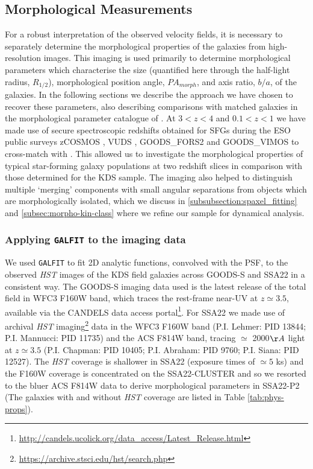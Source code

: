 \documentclass[fleqn,usenatbib]{mnras}
\begin{document}
\subsection{Morphological Measurements}\label{subsec:morphological_measurements}
For a robust interpretation of the observed velocity fields, it is necessary to separately determine the morphological properties of the galaxies from high-resolution images.
This imaging is used primarily to determine morphological parameters which characterise the size (quantified here through the half-light radius, $R_{1/2}$), morphological position angle, $PA_{morph}$, and axis ratio, $b/a$, of the galaxies. 
In the following sections we describe the approach we have chosen to recover these parameters, also describing comparisons with matched galaxies in the morphological parameter catalogue of \cite{VanderWel2012}.
At $3 < z < 4$ and $0.1 < z < 1$ we have made use of secure spectroscopic redshifts obtained for SFGs during the ESO public surveys zCOSMOS \citep{Lilly2007}, VUDS \citep{Tasca2016}, GOODS\_FORS2 \citep{Vanzella2005,Vanzella2006,Vanzella2008} and GOODS\_VIMOS \citep{Balestra2010} to cross-match with \cite{VanderWel2012}.
This allowed us to investigate the morphological properties of typical star-forming galaxy populations at two redshift slices in comparison with those determined for the KDS sample.
The imaging also helped to distinguish multiple `merging' components with small angular separations from objects which are morphologically isolated, which we discuss in \cref{subsubsection:spaxel_fitting} and \cref{subsec:morpho-kin-class} where we refine our sample for dynamical analysis.

\subsubsection{Applying {\tt GALFIT} to the imaging data}\label{subsubsec:galfitting}
We used {\tt GALFIT} \citep{Peng2010_galfit} to fit 2D analytic functions, convolved with the PSF, to the observed {\em HST} images of the KDS field galaxies across GOODS-S and SSA22 in a consistent way.
The GOODS-S imaging data used is the latest release of the total field in WFC3 F160W band, which traces the rest-frame near-UV at $z\simeq3.5$, available via the CANDELS \citep{Grogin2011,Koekemoer2011} data access portal\footnote{\url{http://candels.ucolick.org/data_access/Latest_Release.html}}.
For SSA22 we made use of archival {\em HST} imaging\footnote{\url{https://archive.stsci.edu/hst/search.php}} data in the WFC3 F160W band (P.I. Lehmer: PID 13844; P.I. Mannucci: PID 11735) and the ACS F814W band, tracing $\simeq$ 2000$\AA$ light at $z\simeq3.5$ (P.I. Chapman: PID 10405; P.I. Abraham: PID 9760; P.I. Siana: PID 12527).
The {\em HST} coverage is shallower in SSA22 (exposure times of $\simeq5$ ks) and the F160W coverage is concentrated on the SSA22-CLUSTER and so we resorted to the bluer ACS F814W data to derive morphological parameters in SSA22-P2 (The galaxies with and without {\em HST} coverage are listed in Table \ref{tab:phys-props}). \\
\end{document}
